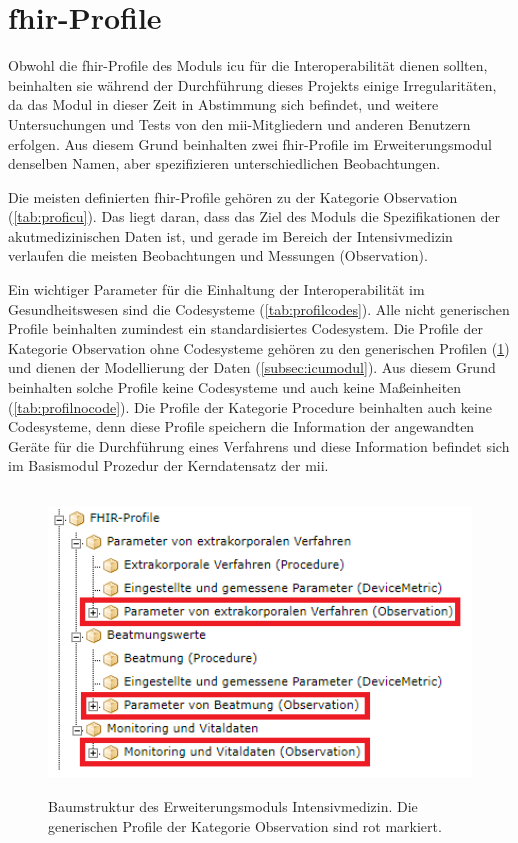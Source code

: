 \section{\acs{fhir}-Profile} \label{sec:fhiricudisc}

Obwohl die \ac{fhir}-Profile des Moduls \glqq\ac{icu}\grqq{} für die Interoperabilität dienen sollten, beinhalten sie während der Durchführung dieses Projekts einige Irregularitäten, da das Modul in dieser Zeit in Abstimmung sich befindet, und weitere Untersuchungen und Tests von den \ac{mii}-Mitgliedern und anderen Benutzern erfolgen. Aus diesem Grund beinhalten zwei \ac{fhir}-Profile im Erweiterungsmodul denselben Namen, aber spezifizieren unterschiedlichen Beobachtungen.

Die meisten definierten \ac{fhir}-Profile gehören zu der Kategorie \glqq Observation\grqq{} (\ref{tab:proficu}). Das liegt daran, dass das Ziel des Moduls die Spezifikationen der akutmedizinischen Daten ist, und gerade im Bereich der Intensivmedizin verlaufen die meisten Beobachtungen und Messungen (\glqq Observation\grqq{}).

Ein wichtiger Parameter für die Einhaltung der Interoperabilität im Gesundheitswesen sind die Codesysteme (\ref{tab:profilcodes}). Alle nicht generischen Profile beinhalten zumindest ein standardisiertes Codesystem. Die Profile der Kategorie \glqq Observation\grqq{} ohne Codesysteme gehören zu den generischen Profilen (\ref{fig:icutreegenerics}) und dienen der Modellierung der Daten (\ref{subsec:icumodul}). Aus diesem Grund beinhalten solche Profile keine Codesysteme und auch keine Maßeinheiten (\ref{tab:profilnocode}). Die Profile der Kategorie \glqq Procedure\grqq{} beinhalten auch keine Codesysteme, denn diese Profile speichern die Information der angewandten Geräte für die Durchführung eines Verfahrens und diese Information befindet sich im Basismodul \glqq Prozedur\grqq{} der Kerndatensatz der \ac{mii}.

\begin{figure}[ht]
	\centering
	\includegraphics[height=8cm]{figures/icu_modul_tree_generics}
	\caption[Generische \glqq Observation\grqq{}-Profile]{Baumstruktur des Erweiterungsmoduls \glqq Intensivmedizin\grqq{}. Die generischen Profile der Kategorie \glqq Observation\grqq{} sind rot markiert.}
	\label{fig:icutreegenerics}
\end{figure}

